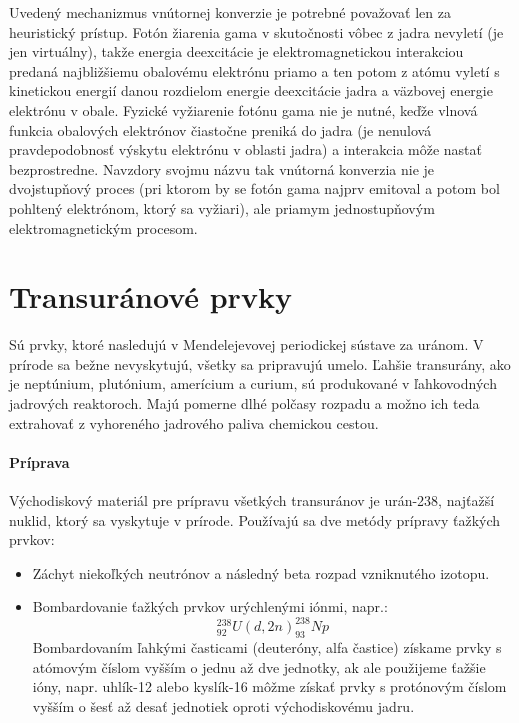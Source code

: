 \documentclass[../../main.tex]{subfiles}
\begin{document}
Uvedený mechanizmus vnútornej konverzie je potrebné považovať len za heuristický prístup. Fotón žiarenia gama v skutočnosti vôbec z jadra nevyletí (je jen virtuálny), takže energia deexcitácie je elektromagnetickou interakciou predaná najbližšiemu obalovému elektrónu priamo a ten potom z atómu vyletí s kinetickou energií danou rozdielom energie deexcitácie jadra a väzbovej energie elektrónu v obale. Fyzické vyžiarenie fotónu gama nie je nutné, keďže vlnová funkcia obalových elektrónov čiastočne preniká do jadra (je nenulová pravdepodobnosť výskytu elektrónu v oblasti jadra) a interakcia môže nastať bezprostredne. Navzdory svojmu názvu tak vnútorná konverzia nie je dvojstupňový proces (pri ktorom by se fotón gama najprv emitoval a potom bol pohltený elektrónom, ktorý sa vyžiari), ale priamym jednostupňovým elektromagnetickým procesom.

\section{Transuránové prvky}
Sú prvky, ktoré nasledujú v Mendelejevovej periodickej sústave za uránom. V prírode sa bežne nevyskytujú, všetky sa pripravujú umelo. Ľahšie transurány, ako je neptúnium, plutónium, amerícium a curium, sú produkované v ľahkovodných jadrových reaktoroch. Majú pomerne dlhé polčasy rozpadu a možno ich teda extrahovať z vyhoreného jadrového paliva chemickou cestou.

\paragraph{Príprava}
Východiskový materiál pre prípravu všetkých transuránov je urán-238, najťažší nuklid, ktorý sa vyskytuje v prírode. Používajú sa dve metódy prípravy ťažkých prvkov:
\begin{itemize}
\item Záchyt niekoľkých neutrónov a následný beta rozpad vzniknutého izotopu.
\item Bombardovanie ťažkých prvkov urýchlenými iónmi, napr.:$$ ^{238}_{92}U (d,2n) ^{238}_{93}Np $$
Bombardovaním ľahkými časticami (deuteróny, alfa častice) získame prvky s atómovým číslom vyšším o jednu až dve jednotky, ak ale použijeme ťažšie ióny, napr. uhlík-12 alebo kyslík-16 môžme získať prvky s protónovým číslom vyšším o šesť až desať jednotiek oproti východiskovému jadru.

\end{itemize}
\end{document}
